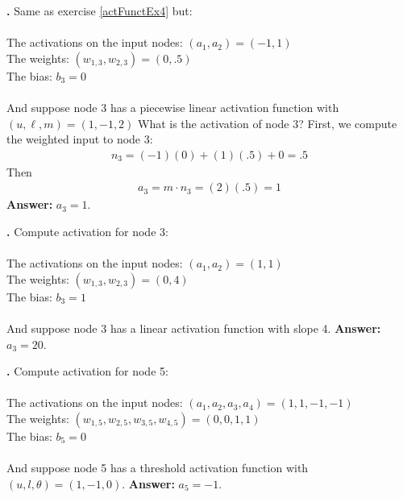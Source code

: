 \bigskip

\noindent
{\bf \theActFunctionCounter.} Same as exercise \ref{actFunctEx4} but: \\ \\
\indent \qquad\qquad The activations on the input nodes: $(a_1,a_2) = (-1,1)$\\
\indent \qquad\qquad The weights: $(w_{1,3}, w_{2,3}) = (0,.5)$ \\
\indent \qquad\qquad The bias: $b_3 = 0$ \\ \\
And suppose node 3 has a piecewise linear activation function with $(u,\ell,m) = (1,-1,2)$ What is the 
activation of node 3?  First, we compute the weighted input to node 3:
\begin{eqnarray*}
n_3 =  (-1)(0)        +     (1)(.5)       + 0 = .5
\end{eqnarray*}
Then 
\begin{eqnarray*}
a_3 = m \cdot n_3  = (2)(.5) = 1
\end{eqnarray*}
{\bf Answer:}  $a_3=1$.

\bigskip

\noindent
{\bf \theActFunctionCounter.} Compute activation for node 3: \\ \\
\indent \qquad\qquad The activations on the input nodes: $(a_1,a_2) = (1,1)$\\
\indent \qquad\qquad The weights: $(w_{1,3}, w_{2,3}) = (0,4)$ \\
\indent \qquad\qquad The bias: $b_3 = 1$ \\ \\
And suppose node 3 has a  linear activation function with slope 4.
{\bf Answer:}  $a_3=20$.

\bigskip

\noindent
{\bf \theActFunctionCounter.} Compute activation for node 5: \\ \\
\indent \qquad\qquad The activations on the input nodes: $(a_1,a_2, a_3, a_4) = (1,1,-1,-1)$\\
\indent \qquad\qquad The weights: $(w_{1,5}, w_{2,5}, w_{3,5}, w_{4,5}) = (0,0,1,1)$ \\
\indent \qquad\qquad The bias: $b_5 = 0$ \\ \\
And suppose node 5 has a threshold activation function with $(u,l,\theta) = (1,-1,0)$.
{\bf Answer:}  $a_5=-1$.

